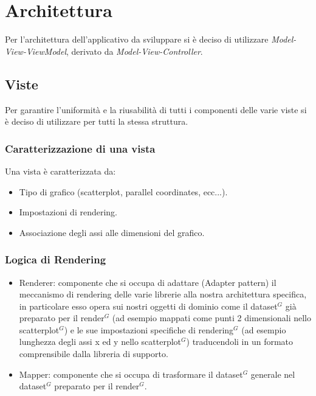 \section{Architettura}

Per l'architettura dell'applicativo da sviluppare si è deciso di utilizzare
\textit{Model-View-ViewModel}, derivato da \textit{Model-View-Controller}.

\subsection{Viste}
Per garantire l'uniformità e la riusabilità di tutti i componenti delle varie
viste si è deciso di utilizzare per tutti la stessa struttura.

\subsubsection{Caratterizzazione di una vista}
Una vista è caratterizzata da:
\begin{itemize}
  \item Tipo di grafico (scatterplot, parallel coordinates, ecc...).
  \item Impostazioni di rendering.
  \item Associazione degli assi alle dimensioni del grafico.
\end{itemize}

\subsubsection{Logica di Rendering}
\begin{itemize}
  \item Renderer: componente che si occupa di adattare (Adapter pattern) il
    meccanismo di rendering delle varie librerie alla nostra architettura
    specifica, in particolare esso opera sui nostri oggetti di dominio come il 
    dataset$^{G}$ già preparato per il render$^{G}$ (ad esempio mappati come punti 2 
    dimensionali nello scatterplot$^{G}$) e le sue impostazioni specifiche di 
    rendering$^{G}$ (ad esempio lunghezza degli assi x ed y nello scatterplot$^{G}$)
    traducendoli in un formato comprensibile dalla libreria di supporto.
  \item Mapper: componente che si occupa di trasformare il dataset$^{G}$ generale nel
    dataset$^{G}$ preparato per il render$^{G}$.
\end{itemize}

